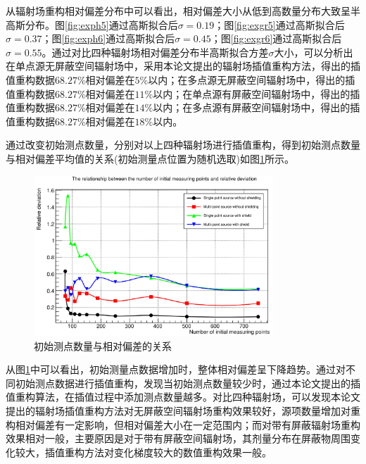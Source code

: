 从辐射场重构相对偏差分布中可以看出，相对偏差大小从低到高数量分布大致呈半高斯分布。图\ref{fig:exph5}通过高斯拟合后$ \sigma = 0.19 $；图\ref{fig:exgr5}通过高斯拟合后$ \sigma = 0.37 $；图\ref{fig:exph6}通过高斯拟合后$ \sigma = 0.45 $；图\ref{fig:exgr6}通过高斯拟合后$ \sigma = 0.55 $。通过对比四种辐射场相对偏差分布半高斯拟合方差$ \sigma $大小，可以分析出在单点源无屏蔽空间辐射场中，采用本论文提出的辐射场插值重构方法，得出的插值重构数据$ 68.27\% $相对偏差在$ 5\% $以内；在多点源无屏蔽空间辐射场中，得出的插值重构数据$ 68.27\% $相对偏差在$ 11\% $以内；在单点源有屏蔽空间辐射场中，得出的插值重构数据$ 68.27\% $相对偏差在$ 14\% $以内；在多点源有屏蔽空间辐射场中，得出的插值重构数据$ 68.27\% $相对偏差在$ 18\% $以内。

通过改变初始测点数量，分别对以上四种辐射场进行插值重构，得到初始测点数量与相对偏差平均值的关系(初始测量点位置为随机选取)如图\ref{初始测点数量与相对偏差的关系}所示。

\begin{figure}[htbp]
    \centering
    \includegraphics[width=0.8\textwidth]{figures/Deviation/MeasurePoints.jpg}
    \caption{初始测点数量与相对偏差的关系}
    \label{初始测点数量与相对偏差的关系}
\end{figure}

从图\ref{初始测点数量与相对偏差的关系}中可以看出，初始测量点数据增加时，整体相对偏差呈下降趋势。通过对不同初始测点数据进行插值重构，发现当初始测点数量较少时，通过本论文提出的插值重构算法，在插值过程中添加测点数量越多。对比四种辐射场，可以发现本论文提出的辐射场插值重构方法对无屏蔽空间辐射场重构效果较好，源项数量增加对重构相对偏差有一定影响，但相对偏差大小在一定范围内；而对带有屏蔽辐射场重构效果相对一般，主要原因是对于带有屏蔽空间辐射场，其剂量分布在屏蔽物周围变化较大，插值重构方法对变化梯度较大的数值重构效果一般。